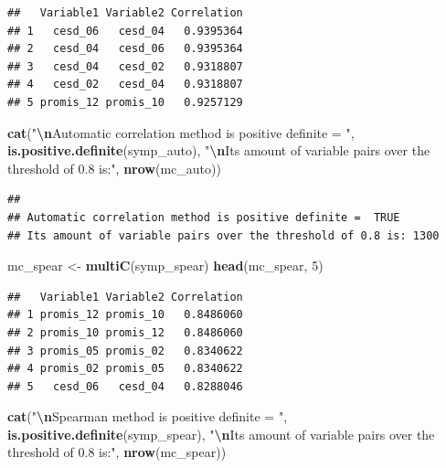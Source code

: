 \documentclass[
]{article}
\newenvironment{Shaded}{\begin{snugshade}}{\end{snugshade}}
\newcommand{\DecValTok}[1]{\textcolor[rgb]{0.00,0.00,0.81}{#1}}
\newcommand{\FunctionTok}[1]{\textcolor[rgb]{0.13,0.29,0.53}{\textbf{#1}}}
\newcommand{\NormalTok}[1]{#1}
\newcommand{\OtherTok}[1]{\textcolor[rgb]{0.56,0.35,0.01}{#1}}
\newcommand{\SpecialCharTok}[1]{\textcolor[rgb]{0.81,0.36,0.00}{\textbf{#1}}}
\newcommand{\StringTok}[1]{\textcolor[rgb]{0.31,0.60,0.02}{#1}}
\begin{document}
\begin{verbatim}
##   Variable1 Variable2 Correlation
## 1   cesd_06   cesd_04   0.9395364
## 2   cesd_04   cesd_06   0.9395364
## 3   cesd_04   cesd_02   0.9318807
## 4   cesd_02   cesd_04   0.9318807
## 5 promis_12 promis_10   0.9257129
\end{verbatim}

\begin{Shaded}
\begin{Highlighting}[]
\FunctionTok{cat}\NormalTok{(}\StringTok{"}\SpecialCharTok{\textbackslash{}n}\StringTok{Automatic correlation method is positive definite = "}\NormalTok{, }\FunctionTok{is.positive.definite}\NormalTok{(symp\_auto), }\StringTok{"}\SpecialCharTok{\textbackslash{}n}\StringTok{Its amount of variable pairs over the threshold of 0.8 is:"}\NormalTok{, }\FunctionTok{nrow}\NormalTok{(mc\_auto))}
\end{Highlighting}
\end{Shaded}

\begin{verbatim}
## 
## Automatic correlation method is positive definite =  TRUE 
## Its amount of variable pairs over the threshold of 0.8 is: 1300
\end{verbatim}

\begin{Shaded}
\begin{Highlighting}[]
\NormalTok{mc\_spear }\OtherTok{\textless{}{-}} \FunctionTok{multiC}\NormalTok{(symp\_spear)}
\FunctionTok{head}\NormalTok{(mc\_spear, }\DecValTok{5}\NormalTok{)}
\end{Highlighting}
\end{Shaded}

\begin{verbatim}
##   Variable1 Variable2 Correlation
## 1 promis_12 promis_10   0.8486060
## 2 promis_10 promis_12   0.8486060
## 3 promis_05 promis_02   0.8340622
## 4 promis_02 promis_05   0.8340622
## 5   cesd_06   cesd_04   0.8288046
\end{verbatim}

\begin{Shaded}
\begin{Highlighting}[]
\FunctionTok{cat}\NormalTok{(}\StringTok{"}\SpecialCharTok{\textbackslash{}n}\StringTok{Spearman method is positive definite = "}\NormalTok{, }\FunctionTok{is.positive.definite}\NormalTok{(symp\_spear), }\StringTok{"}\SpecialCharTok{\textbackslash{}n}\StringTok{Its amount of variable pairs over the threshold of 0.8 is:"}\NormalTok{, }\FunctionTok{nrow}\NormalTok{(mc\_spear))}
\end{Highlighting}
\end{Shaded}
\end{document}
